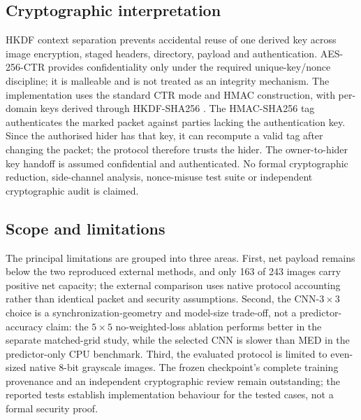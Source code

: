 \documentclass[preprint,12pt,a4paper]{elsarticle}
\begin{document}
\subsection{Cryptographic interpretation}

HKDF context separation prevents accidental reuse of one derived key across image encryption, staged headers, directory, payload and authentication. AES-256-CTR provides confidentiality only under the required unique-key/nonce discipline; it is malleable and is not treated as an integrity mechanism. The implementation uses the standard CTR mode and HMAC construction, with per-domain keys derived through HKDF-SHA256 \cite{nist2001,rfc2104,rfc5869}. The HMAC-SHA256 tag authenticates the marked packet against parties lacking the authentication key. Since the authorised hider has that key, it can recompute a valid tag after changing the packet; the protocol therefore trusts the hider. The owner-to-hider key handoff is assumed confidential and authenticated. No formal cryptographic reduction, side-channel analysis, nonce-misuse test suite or independent cryptographic audit is claimed.

\subsection{Scope and limitations}

The principal limitations are grouped into three areas. First, net payload remains below the two reproduced external methods, and only 163 of 243 images carry positive net capacity; the external comparison uses native protocol accounting rather than identical packet and security assumptions. Second, the CNN-$3\times3$ choice is a synchronization-geometry and model-size trade-off, not a predictor-accuracy claim: the $5\times5$ no-weighted-loss ablation performs better in the separate matched-grid study, while the selected CNN is slower than MED in the predictor-only CPU benchmark. Third, the evaluated protocol is limited to even-sized native 8-bit grayscale images. The frozen checkpoint's complete training provenance and an independent cryptographic review remain outstanding; the reported tests establish implementation behaviour for the tested cases, not a formal security proof.
\end{document}
